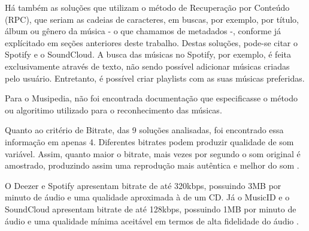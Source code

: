 Há também as soluções que utilizam o método de Recuperação por Conteúdo (RPC), que seriam as cadeias de caracteres, em buscas, por exemplo, por título, álbum ou gênero da música - o que chamamos de metadados -, conforme já explícitado em seções anteriores deste trabalho. Destas soluções, pode-se citar o Spotify e o SoundCloud. A busca das músicas no Spotify, por exemplo, é feita exclusivamente através de texto, não sendo possível adicionar músicas criadas pelo usuário. Entretanto, é possível criar playlists com as suas músicas preferidas.

Para o Musipedia, não foi encontrada documentação que especificasse o método ou algoritimo utilizado para o reconhecimento das músicas.

Quanto ao critério de Bitrate, das 9 soluções analisadas, foi encontrado essa informação em apenas 4. Diferentes bitrates podem produzir qualidade de som variável. Assim, quanto maior o bitrate, mais vezes por segundo o som original é amostrado, produzindo assim uma reprodução mais autêntica e melhor do som \cite{sandisk}.

O Deezer e Spotify apresentam bitrate de até 320kbps, possuindo 3MB por minuto de áudio e uma qualidade aproximada à de um CD. Já o MusicID e o SoundCloud apresentam bitrate de até 128kbps, possuindo 1MB por minuto de áudio e uma qualidade mínima aceitável em termos de alta fidelidade do áudio \cite{sean2012}.

